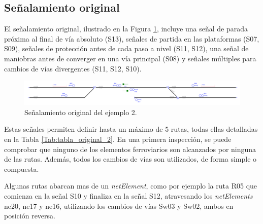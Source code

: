 \subsection{Señalamiento original}

    El señalamiento original, ilustrado en la Figura \ref{fig:EJ2_2}, incluye una señal de parada próxima al final de vía absoluto (S13), señales de partida en las plataformas (S07, S09), señales de protección antes de cada paso a nivel (S11, S12), una señal de maniobras antes de converger en una vía principal (S08) y señales múltiples para cambios de vías divergentes (S11, S12, S10).
    
    \begin{figure}[H]
    	\centering
    	\includegraphics[width=1\textwidth]{resultados-obtenidos/ejemplo2/images/2_original.png}
    	\centering\caption{Señalamiento original del ejemplo 2.}
    	\label{fig:EJ2_2}
    \end{figure}
    
    Estas señales permiten definir hasta un máximo de 5 rutas, todas ellas detalladas en la Tabla \ref{Tab:tabla_original_2}. En una primera inspección, se puede comprobar que ninguno de los elementos ferroviarios son alcanzados por ninguna de las rutas. Además, todos los cambios de vías son utilizados, de forma simple o compuesta. 
    
    \begin{table}[H]
        {
        \caption{Tabla de enclavamiento original del ejemplo 2.}
        \label{Tab:tabla_original_2}
        \centering
     }
    \end{table}
    
    Algunas rutas abarcan mas de un \textit{netElement}, como por ejemplo la ruta R05 que comienza en la señal S10 y finaliza en la señal S12, atravesando los \textit{netElements} ne20, ne17 y ne16, utilizando los cambios de vías Sw03 y Sw02, ambos en posición reversa.